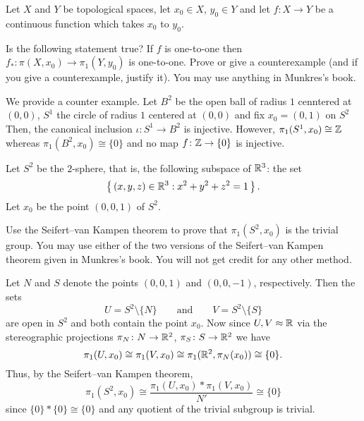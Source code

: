\begin{problem}
  Let \(X\) and \(Y\) be topological spaces, let \(x_0\in X\), \(y_0\in Y\)
  and let \(f\colon X\to Y\) be a continuous function which takes \(x_0\)
  to \(y_0\).

  Is the following statement true? If \(f\) is one-to-one then
  \(f_*\colon\pi(X,x_0)\to \pi_1(Y,y_0)\) is one-to-one. Prove or give a
  counterexample (and if you give a counterexample, justify it). You may
  use anything in Munkres's book.
\end{problem}
\begin{solution}
  We provide a counter example. Let \(B^2\) be the open ball of radius
  \(1\) cenntered at \((0,0)\), \(S^1\) the circle of radius \(1\) centered
  at \((0,0)\) and fix \(x_0=(0,1)\) on \(S^2\) Then, the canonical
  inclusion \(\iota\colon S^1\to B^2\) is injective. However,
  \(\pi_1(S^1,x_0)\cong\mathbb{Z}\) whereas \(\pi_1(B^2,x_0)\cong \{0\}\) and no
  map \(f\colon\mathbb{Z}\to\{0\}\) is injective.
\end{solution}

\begin{problem}
  Let \(S^2\) be the \(2\)-sphere, that is, the following subspace of
  \(\mathbb{R}^3\): the set
  \[
    \left\{\,(x,y,z)\in\mathbb{R}^3:x^2+y^2+z^2=1\,\right\}.
  \]
  Let \(x_0\) be the point \((0,0,1)\) of \(S^2\).


  Use the Seifert--van Kampen theorem to prove that \(\pi_1(S^2,x_0)\) is
  the trivial group. You may use either of the two versions of the
  Seifert--van Kampen theorem given in Munkres's book. You will not get
  credit for any other method.
\end{problem}

\begin{solution}
  Let \(N\) and \(S\) denote the points \((0,0,1)\) and \((0,0,-1)\),
  respectively. Then the sets
  \[
    U=S^2\setminus\{N\}\qquad\text{and}\qquad V=S^2\setminus\{S\}
  \]
  are open in \(S^2\) and both contain the point \(x_0\). Now since
  \(U,V\approx\mathbb{R}\) via the stereographic projections
  \(\pi_N\colon N\to\mathbb{R}^2\), \(\pi_S\colon S\to\mathbb{R}^2\) we have
  \[
    \pi_1(U,x_0)\cong\pi_1(V,x_0)\cong\pi_1(\mathbb{R}^2,\pi_N(x_0))\cong\{0\}.
  \]
  Thus, by the Seifert--van Kampen theorem,
  \[
    \pi_1(S^2,x_0)\cong\frac{\pi_1(U,x_0)*\pi_1(V,x_0)}{N'}\cong\{0\}
  \]
  since \(\{0\}*\{0\}\cong\{0\}\) and any quotient of the trivial subgroup
  is trivial.
\end{solution}

